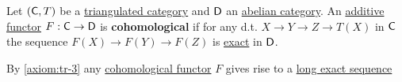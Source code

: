 \documentclass[../../main]{subfiles}
\begin{document}
\begin{definition}\label{def:cohomological-functor}
  Let \((\mathsf{C}, T)\) be a \hyperref[def:triangulated-category]{triangulated category} and \(\mathsf{D}\) an \hyperref[def:abelian-category]{abelian category}.
  An \hyperref[def:additive-functor]{additive functor} \(F: \mathsf{C} \to \mathsf{D}\) is \textbf{cohomological} if for any d.t. \(X \to Y \to Z \to T(X)\) in \(\mathsf{C}\) the sequence \(F(X) \to F(Y) \to F(Z)\) is \hyperref[def:exact-sequence]{exact} in \(\mathsf{D}\).
\end{definition}

\begin{remark}
  By \ref{axiom:tr-3} any \hyperref[def:cohomological-functor]{cohomological functor} \(F\) gives rise to a \hyperref[def:exact-sequence]{long exact sequence}
    \begin{center}
  \end{center}
\end{remark}
\end{document}
